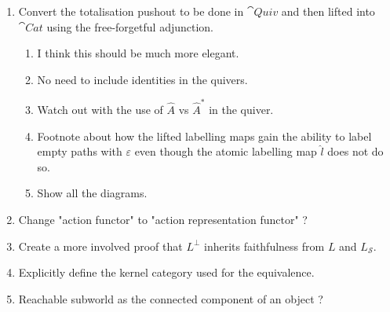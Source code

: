 {\begin{enumerate}
    \begin{enumerate}
        \item Can multiple quivers generate the same free category or do those quivers only become identified when $\sim$ is applied ?
        \item Is there a property that shows if the quiver $Q$ is the smallest necessary quiver that generates $\mathcal{F}(Q)$ ?
        Perhaps something like $\eta_{Q}$ being the identity morphism ?
    \end{enumerate}
    \item Convert the totalisation pushout to be done in $\cat{Quiv}$ and then lifted into $\cat{Cat}$ using the free-forgetful adjunction.
    \begin{enumerate}
        \item I think this should be much more elegant.
        \item No need to include identities in the quivers.
        \item Watch out with the use of $\hat{A}$ vs $\hat{A}^{*}$ in the quiver.
        \item Footnote about how the lifted labelling maps gain the ability to label empty paths with $\varepsilon$ even though the atomic labelling map $\hat{l}$ does not do so.
        \item Show all the diagrams.
    \end{enumerate}
    \item Change "action functor" to "action representation functor" ?
    \item Create a more involved proof that $L^{\bot}$ inherits faithfulness from $L$ and $L_{\mathcal{S}}$.
    \item Explicitly define the kernel category used for the equivalence.
    \item Reachable subworld as the connected component of an object ?
\end{enumerate}
}

